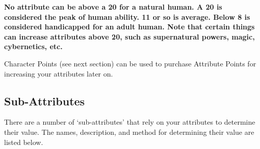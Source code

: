 \documentclass[twoside]{book}
\begin{document}
 \textbf{ No attribute can be above a 20 for a natural human.
               A 20 is considered the peak of human ability. 11 or so is
               average. Below 8 is considered handicapped for an adult
               human. Note that certain things can increase attributes
               above 20, such as supernatural powers, magic, cybernetics,
               etc. }


    {  
    Character Points (see next section) can be used to
               purchase Attribute Points for increasing your attributes
               later on. 
    }
  
    

\subsection{Sub-Attributes}
    
    {  
    There are a number of `sub-attributes'
               that rely on your attributes to determine their value. The
               names, description, and method for determining their value
               are listed below. 
    }
  
\end{document}
